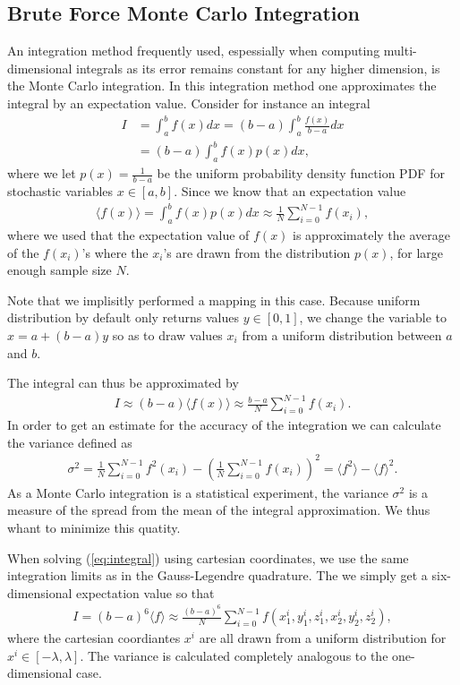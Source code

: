 \documentclass[10pt, twocolumn]{aastex62}
\begin{document}
\subsection{Brute Force Monte Carlo Integration}\label{subsec:brute_force_monte_carlo}
An integration method frequently used, espessially when computing
multi-dimensional integrals as its error remains constant for any higher
dimension, is the Monte Carlo integration. In this integration method one
approximates the integral by an expectation value. Consider for instance an
integral 
\begin{align}
	I &= \int^b_a f(x)dx = (b-a)\int^b_a\frac{f(x)}{b-a}dx \\	
	&= (b-a)\int^b_af(x)p(x)dx,
\end{align}
where we let $p(x) = \frac{1}{b-a}$ be the uniform probability density function
PDF for stochastic variables $x\in[a, b]$. Since we know that an expectation
value 
\begin{align}
	\langle f(x)\rangle = \int^b_a f(x)p(x)dx \approx \frac{1}{N}\sum_{i=0}^{N-1} f(x_i),
\end{align}
where we used that the expectation value of $f(x)$ is approximately the average
of the $f(x_i)$'s where the $x_i$'s are drawn from the distribution $p(x)$, for
large enough sample size $N$. 

Note that we implisitly performed a mapping in this case. Because uniform
distribution by default only returns values $y\in[0, 1]$, we change the variable
to $x = a + (b-a)y$ so as to draw values $x_i$ from a uniform distribution
between $a$ and $b$. 

The integral can thus be approximated by 
\begin{align}
	I \approx (b-a)\langle f(x) \rangle \approx \frac{b-a}{N}\sum^{N-1}_{i=0}f(x_i).
\end{align}
In order to get an estimate for the accuracy of the integration we can calculate
the variance defined as 
\begin{align}
	\sigma^2 = \frac{1}{N}\sum_{i=0}^{N-1} f^2(x_i) - \left(\frac{1}{N}\sum_{i=0}^{N-1}f(x_i)\right)^2 = \langle f^2\rangle - \langle f\rangle^2.
\end{align}
As a Monte Carlo integration is a statistical experiment, the variance
$\sigma^2$ is a measure of the spread from the mean of the integral
approximation. We thus whant to minimize this quatity.

When solving (\ref{eq:integral}) using cartesian coordinates, we use the same
integration limits as in the Gauss-Legendre quadrature. The we simply get a
six-dimensional expectation value so that 
\begin{align}
	I = (b-a)^6\langle f \rangle \approx \frac{(b-a)^6}{N}\sum^{N-1}_{i=0} f(x_1^i, y_1^i, z_1^i, x_2^i, y_2^i, z_2^i),
\end{align}
where the cartesian coordiantes $x^i$ are all drawn from a uniform distribution
for $x^i\in[-\lambda, \lambda]$. The variance is calculated completely analogous
to the one-dimensional case. 
\end{document}
